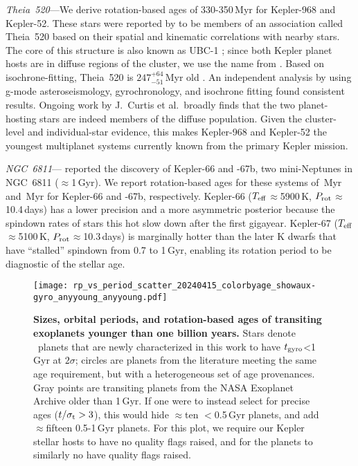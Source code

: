 \documentclass[11pt,twocolumn,tighten]{aastex63}
\begin{document}
{\it Theia~520}---We derive rotation-based ages of 330-350\,Myr for
Kepler-968 and Kepler-52.  These stars were reported by
\citet{2019AJ....158..122K} to be members of an association called
Theia~520 based on their spatial and kinematic correlations with
nearby stars.  The core of this structure is also known as UBC-1
\citep{2018A&A...618A..59C}; since both Kepler planet hosts are in
diffuse regions of the cluster, we use the name from
\citeauthor{2019AJ....158..122K}.  Based on isochrone-fitting,
Theia~520 is $247^{+64}_{-51}$\,Myr old \citep{2019AJ....158..122K}.
An independent analysis by \citet{2024A&A...681A..13F} using g-mode
asteroseismology, gyrochronology, and isochrone fitting found
consistent results.  Ongoing work by J.~Curtis et al.~broadly finds
that the two planet-hosting stars are indeed members of the diffuse
population.  Given the cluster-level and individual-star evidence,
this makes Kepler-968 and Kepler-52 the youngest multiplanet systems
currently known from the primary Kepler mission.

{\it NGC~6811}---\citet{Meibom_2013} reported the discovery of
Kepler-66 and -67b, two mini-Neptunes in NGC~6811 ($\approx$1\,Gyr).
We report rotation-based ages for these systems of
\kepsixsixtgyro\,Myr and \kepsixseventgyro\,Myr for Kepler-66 and
-67b, respectively.  Kepler-66 ($T_{\rm eff}$$\approx$5900\,K, $P_{\rm
rot}$$\approx$10.4\,days) has a lower precision and a more asymmetric
posterior because the spindown rates of stars this hot slow down after
the first gigayear.  Kepler-67 ($T_{\rm eff}$$\approx$5100\,K, $P_{\rm
rot}$$\approx$10.3\,days) is marginally hotter than the later K dwarfs
that have ``stalled'' spindown from 0.7 to 1\,Gyr, enabling its
rotation period to be diagnostic of the stellar age.

\begin{figure}[!t]
  \begin{center}
    \texttt{[image: rp\_vs\_period\_scatter\_20240415\_colorbyage\_showaux-gyro\_anyyoung\_anyyoung.pdf]}
  \end{center}
  \vspace{-0.5cm}
  \caption{
    {\bf Sizes, orbital periods, and rotation-based ages of transiting
    exoplanets younger than one billion years.} Stars denote
    \nplyounggyrotwosigmanograzingnoruwe\ planets that are newly
    characterized in this work to have $t_{\rm gyro}$<1\,Gyr at
    $2$$\sigma$; circles are planets from the literature meeting the
    same age requirement, but with a heterogeneous set of age
    provenances.  Gray points are transiting planets from the NASA
    Exoplanet Archive older than 1\,Gyr.  If one were to instead
    select for precise ages ($t/\sigma_{\rm t}>3$), this would hide
    $\approx$ten $<$0.5\,Gyr planets, and add $\approx$fifteen
    0.5-1\,Gyr planets.  For this plot, we require our Kepler stellar
    hosts to have no quality flags raised, and for the planets to
    similarly no have quality flags raised. 
    \label{fig:rp_period_age_results}
  }
\end{figure}
\end{document}
